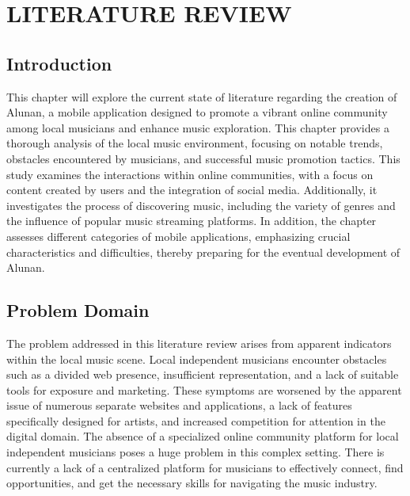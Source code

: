 \chapter{LITERATURE REVIEW}
\label{ch:litreview}

\section{Introduction}
This chapter will explore the current state of literature regarding the creation of Alunan, a mobile application designed to promote a vibrant online community among local musicians and enhance music exploration. This chapter provides a thorough analysis of the local music environment, focusing on notable trends, obstacles encountered by musicians, and successful music promotion tactics. This study examines the interactions within online communities, with a focus on content created by users and the integration of social media. Additionally, it investigates the process of discovering music, including the variety of genres and the influence of popular music streaming platforms. In addition, the chapter assesses different categories of mobile applications, emphasizing crucial characteristics and difficulties, thereby preparing for the eventual development of Alunan.

\section{Problem Domain}
The problem addressed in this literature review arises from apparent indicators within the local music scene. Local independent musicians encounter obstacles such as a divided web presence, insufficient representation, and a lack of suitable tools for exposure and marketing. These symptoms are worsened by the apparent issue of numerous separate websites and applications, a lack of features specifically designed for artists, and increased competition for attention in the digital domain. The absence of a specialized online community platform for local independent musicians poses a huge problem in this complex setting. There is currently a lack of a centralized platform for musicians to effectively connect, find opportunities, and get the necessary skills for navigating the music industry. \\

